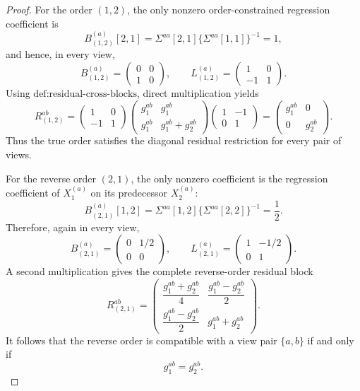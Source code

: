 \documentclass{article}
\begin{document}
\begin{proof}
For the order \((1,2)\), the only nonzero order-constrained regression coefficient is
\[
B_{(1,2)}^{(a)}[2,1]
=\Sigma^{aa}[2,1]\{\Sigma^{aa}[1,1]\}^{-1}=1,
\]
and hence, in every view,
\[
B_{(1,2)}^{(a)}=\begin{pmatrix}0&0\\1&0\end{pmatrix},
\qquad
L_{(1,2)}^{(a)}=\begin{pmatrix}1&0\\-1&1\end{pmatrix}.
\]
Using \(\text{def:residual-cross-blocks}\), direct multiplication yields
\[
R_{(1,2)}^{ab}
=\begin{pmatrix}1&0\\-1&1\end{pmatrix}
\begin{pmatrix}g_1^{ab}&g_1^{ab}\\g_1^{ab}&g_1^{ab}+g_2^{ab}\end{pmatrix}
\begin{pmatrix}1&-1\\0&1\end{pmatrix}
=\begin{pmatrix}g_1^{ab}&0\\0&g_2^{ab}\end{pmatrix}.
\]
Thus the true order satisfies the diagonal residual restriction for every pair of views.

For the reverse order \((2,1)\), the only nonzero coefficient is the regression coefficient of \(X_1^{(a)}\) on its predecessor \(X_2^{(a)}\):
\[
B_{(2,1)}^{(a)}[1,2]
=\Sigma^{aa}[1,2]\{\Sigma^{aa}[2,2]\}^{-1}=\frac12.
\]
Therefore, again in every view,
\[
B_{(2,1)}^{(a)}=\begin{pmatrix}0&1/2\\0&0\end{pmatrix},
\qquad
L_{(2,1)}^{(a)}=\begin{pmatrix}1&-1/2\\0&1\end{pmatrix}.
\]
A second multiplication gives the complete reverse-order residual block
\[
R_{(2,1)}^{ab}
=\begin{pmatrix}
\dfrac{g_1^{ab}+g_2^{ab}}4&\dfrac{g_1^{ab}-g_2^{ab}}2\\[4pt]
\dfrac{g_1^{ab}-g_2^{ab}}2&g_1^{ab}+g_2^{ab}
\end{pmatrix}.
\]
It follows that the reverse order is compatible with a view pair \(\{a,b\}\) if and only if
\[
g_1^{ab}=g_2^{ab}.
\]


\end{proof}
\end{document}

